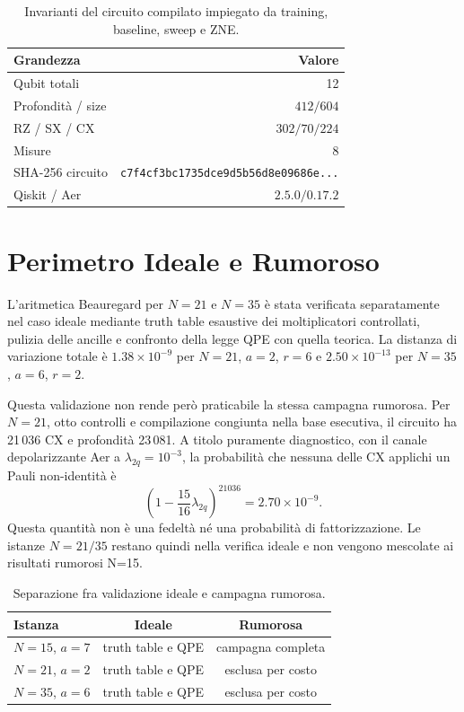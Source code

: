 \begin{onehalfspace}
\begin{table}[H]
\centering
\caption[Contratto riproducibile della campagna N=15]{Invarianti del
circuito compilato impiegato da training, baseline, sweep e ZNE.}
\label{tab:correzione_seed}
\label{tab:circuit_depth}
\begin{tabular}{lr}
\toprule
\textbf{Grandezza} & \textbf{Valore} \\
\midrule
Qubit totali & 12 \\
Profondità / size & $412/604$ \\
RZ / SX / CX & $302/70/224$ \\
Misure & 8 \\
SHA-256 circuito & \texttt{c7f4cf3bc1735dce9d5b56d8e09686e...} \\
Qiskit / Aer & $2.5.0/0.17.2$ \\
\bottomrule
\end{tabular}
\end{table}

\section{Perimetro Ideale e Rumoroso}
\label{sec:circuito_m1}
\label{sec:scalabilita}

L'aritmetica Beauregard per $N=21$ e $N=35$ è stata verificata
separatamente nel caso ideale mediante truth table esaustive dei
moltiplicatori controllati, pulizia delle ancille e confronto della legge
QPE con quella teorica. La distanza di variazione totale è
$1.38\times10^{-9}$ per $N=21$, $a=2$, $r=6$ e
$2.50\times10^{-13}$ per $N=35$, $a=6$, $r=2$.

Questa validazione non rende però praticabile la stessa campagna
rumorosa. Per $N=21$, otto controlli e compilazione congiunta nella base
esecutiva, il circuito ha 21\,036 CX e profondità 23\,081. A titolo
puramente diagnostico, con il canale depolarizzante Aer a
$\lambda_{2q}=10^{-3}$, la probabilità che nessuna delle CX applichi un
Pauli non-identità è
\[
  \left(1-\frac{15}{16}\lambda_{2q}\right)^{21036}
  =2.70\times10^{-9}.
\]
Questa quantità non è una fedeltà né una probabilità di fattorizzazione.
Le istanze $N=21/35$ restano quindi nella verifica ideale e non vengono
mescolate ai risultati rumorosi N=15.

\begin{table}[H]
\centering
\caption[Perimetro delle validazioni]{Separazione fra validazione ideale
e campagna rumorosa.}
\label{tab:costo_simulazione}
\begin{tabular}{lcc}
\toprule
\textbf{Istanza} & \textbf{Ideale} & \textbf{Rumorosa} \\
\midrule
$N=15$, $a=7$ & truth table e QPE & campagna completa \\
$N=21$, $a=2$ & truth table e QPE & esclusa per costo \\
$N=35$, $a=6$ & truth table e QPE & esclusa per costo \\
\bottomrule
\end{tabular}
\end{table}


\end{onehalfspace}
